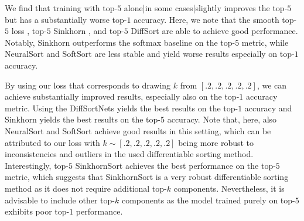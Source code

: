 \documentclass{article}
\begin{document}
We find that training with top-$5$ alone|in some cases|slightly improves the top-$5$ but has a substantially worse top-$1$ accuracy.
Here, we note that the smooth top-$5$ loss \citep{berrada2018smooth}, top-$5$ Sinkhorn \citep{Cuturi2019-SortingOT}, and top-$5$ DiffSort \citep{Petersen2021-diffsort} are able to achieve good performance.
Notably, Sinkhorn \citep{Cuturi2019-SortingOT} outperforms the softmax baseline on the top-$5$ metric, while NeuralSort and SoftSort are less stable and yield worse results especially on top-$1$ accuracy. 

By using our loss that corresponds to drawing $k$ from $[.2,.2,.2,.2,.2]$, we can achieve substantially improved results, especially also on the top-$1$ accuracy metric.
Using the DiffSortNets yields the best results on the top-$1$ accuracy and Sinkhorn yields the best results on the top-$5$ accuracy.
Note that, here, also NeuralSort and SoftSort achieve good results in this setting, which can be attributed to our loss with $k\sim[.2,.2,.2,.2,.2]$ being more robust to inconsistencies and outliers in the used differentiable sorting method.
Interestingly, top-$5$ SinkhornSort achieves the best performance on the top-$5$ metric, which suggests that SinkhornSort is a very robust differentiable sorting method as it does not require additional top-$k$ components.
Nevertheless, it is advisable to include other top-$k$ components as the model trained purely on top-$5$ exhibits poor top-$1$ performance.
\end{document}
